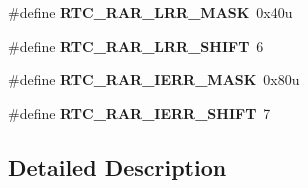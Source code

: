 \begin{DoxyCompactItemize}
\item 
\#define {\bfseries R\+T\+C\+\_\+\+R\+A\+R\+\_\+\+L\+R\+R\+\_\+\+M\+A\+SK}~0x40u\hypertarget{group__RTC__Register__Masks_ga3ff3b63507d843cbf0c4738aea636510}{}\label{group__RTC__Register__Masks_ga3ff3b63507d843cbf0c4738aea636510}

\item 
\#define {\bfseries R\+T\+C\+\_\+\+R\+A\+R\+\_\+\+L\+R\+R\+\_\+\+S\+H\+I\+FT}~6\hypertarget{group__RTC__Register__Masks_gab21813ba6c73f55e69563b0fcfbd0d73}{}\label{group__RTC__Register__Masks_gab21813ba6c73f55e69563b0fcfbd0d73}

\item 
\#define {\bfseries R\+T\+C\+\_\+\+R\+A\+R\+\_\+\+I\+E\+R\+R\+\_\+\+M\+A\+SK}~0x80u\hypertarget{group__RTC__Register__Masks_ga000c148fd3ee9bfbe8f5a96edb4f395d}{}\label{group__RTC__Register__Masks_ga000c148fd3ee9bfbe8f5a96edb4f395d}

\item 
\#define {\bfseries R\+T\+C\+\_\+\+R\+A\+R\+\_\+\+I\+E\+R\+R\+\_\+\+S\+H\+I\+FT}~7\hypertarget{group__RTC__Register__Masks_gaf3ac1fe81dcd5b54cfe9d8d2125345aa}{}\label{group__RTC__Register__Masks_gaf3ac1fe81dcd5b54cfe9d8d2125345aa}

\end{DoxyCompactItemize}


\subsection{Detailed Description}
